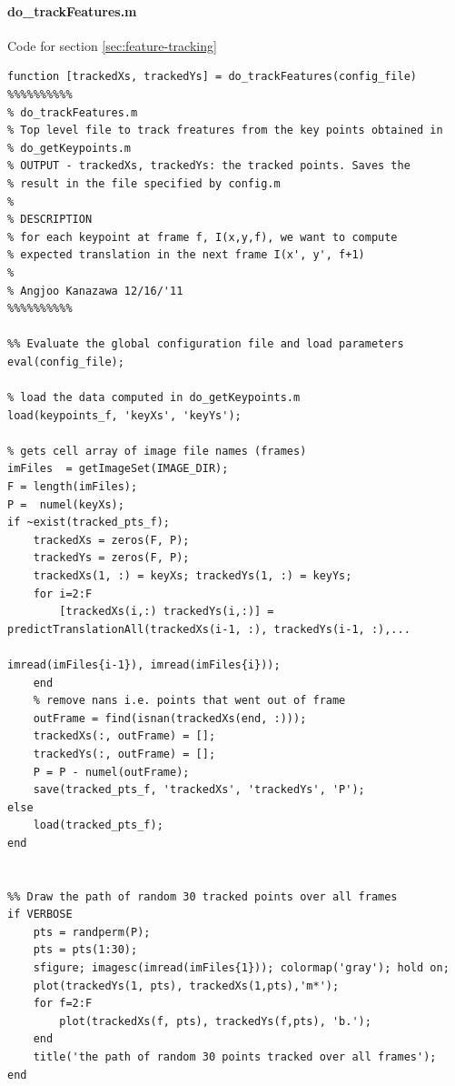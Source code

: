 \paragraph{do\_trackFeatures.m}
Code for section \ref{sec:feature-tracking}
\begin{verbatim}
function [trackedXs, trackedYs] = do_trackFeatures(config_file)
%%%%%%%%%%
% do_trackFeatures.m
% Top level file to track freatures from the key points obtained in
% do_getKeypoints.m
% OUTPUT - trackedXs, trackedYs: the tracked points. Saves the
% result in the file specified by config.m
%
% DESCRIPTION 
% for each keypoint at frame f, I(x,y,f), we want to compute
% expected translation in the next frame I(x', y', f+1)
%
% Angjoo Kanazawa 12/16/'11
%%%%%%%%%%

%% Evaluate the global configuration file and load parameters
eval(config_file);

% load the data computed in do_getKeypoints.m
load(keypoints_f, 'keyXs', 'keyYs');

% gets cell array of image file names (frames)
imFiles  = getImageSet(IMAGE_DIR); 
F = length(imFiles);
P =  numel(keyXs);
if ~exist(tracked_pts_f);
    trackedXs = zeros(F, P);
    trackedYs = zeros(F, P);
    trackedXs(1, :) = keyXs; trackedYs(1, :) = keyYs;
    for i=2:F
        [trackedXs(i,:) trackedYs(i,:)] = predictTranslationAll(trackedXs(i-1, :), trackedYs(i-1, :),...
                                                          imread(imFiles{i-1}), imread(imFiles{i}));
    end
    % remove nans i.e. points that went out of frame
    outFrame = find(isnan(trackedXs(end, :)));
    trackedXs(:, outFrame) = [];
    trackedYs(:, outFrame) = [];
    P = P - numel(outFrame);
    save(tracked_pts_f, 'trackedXs', 'trackedYs', 'P');
else
    load(tracked_pts_f);
end


%% Draw the path of random 30 tracked points over all frames
if VERBOSE
    pts = randperm(P);
    pts = pts(1:30);
    sfigure; imagesc(imread(imFiles{1})); colormap('gray'); hold on;
    plot(trackedYs(1, pts), trackedXs(1,pts),'m*');
    for f=2:F
        plot(trackedXs(f, pts), trackedYs(f,pts), 'b.');
    end
    title('the path of random 30 points tracked over all frames');
end
\end{verbatim}

